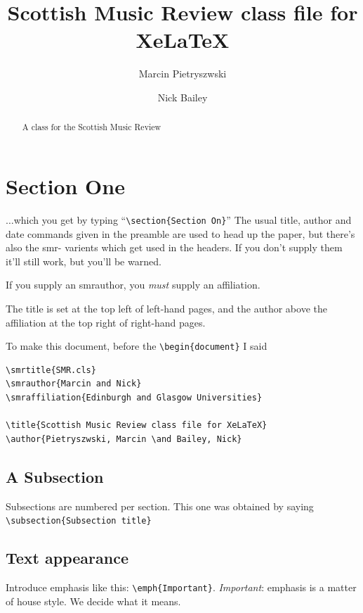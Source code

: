 \documentclass{SMR}
\title{Scottish Music Review class file for XeLaTeX}
\author{Marcin Pietryszwski \and Nick Bailey}
\begin{document}
\newcommand{\cmd}[1]{\texttt{\textbackslash #1}}

\maketitle

\begin{abstract}
A class for the Scottish Music Review
\end{abstract}

\section{Section One} %

$\ldots$which you get by typing ``\cmd{section\{Section On\}}''
The usual title, author and date commands given in the preamble
are used to head up the paper, but there's also the smr- varients
which get used in the headers. 
If you don't supply them it'll still work, but you'll be warned.

If you supply an smrauthor, you \emph{must} supply an affiliation.

The title is set at the top left of left-hand pages, and the
author above the affiliation at the top right of right-hand pages.

To make this document, before
the \cmd{begin\{document\}} I said

\begin{verbatim}
\smrtitle{SMR.cls}
\smrauthor{Marcin and Nick}
\smraffiliation{Edinburgh and Glasgow Universities}

\title{Scottish Music Review class file for XeLaTeX}
\author{Pietryszwski, Marcin \and Bailey, Nick}
\end{verbatim}

\subsection{A Subsection} %

Subsections are numbered per section. This one was obtained by saying
\cmd{subsection\{Subsection title\}}

\subsection{Text appearance}
Introduce emphasis like this: \cmd{emph\{Important\}}.
\emph{Important}: emphasis is a matter of house style.
We decide what it means.
\end{document}
